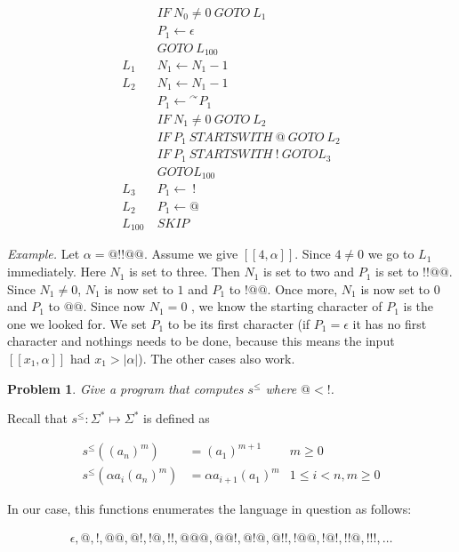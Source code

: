 \documentclass[a4paper, 12pt]{article}
\newtheorem{problem}{Problem}
\newtheorem{problem}{Problem}
\begin{document}
\begin{align*}
    &IF ~ N_0 \neq 0 ~ GOTO ~ L_1 \\ 
    &P_1 \leftarrow \epsilon \\ 
    & GOTO ~ L_{100} \\
    L_1 ~ & N_1 \leftarrow N_1 - 1 \\ 
    L_2 ~ & N_1 \leftarrow N_1 - 1 \\ 
          &P_1 \leftarrow {}^{\curvearrowright} P_1\\
    &IF ~ N_1 \neq 0 ~ GOTO ~ L_2\\
    &IF ~ P_1 ~ STARTSWITH ~ @ ~ GOTO ~ L_2 \\ 
    &IF ~ P_1 ~ STARTSWITH ~ ! ~ GOTO L_3\\ 
    & GOTO L_{100}\\
    L_3~&P_1 \leftarrow ~ !\\
    L_2 ~ &P_1 \leftarrow  @ \\ 
    L_{100} ~ & SKIP
\end{align*}

\textit{Example.} Let $\alpha = @!!@@$. Assume we give $[\![ 4, \alpha ]\!]$.
Since $4 \neq 0$ we go to $L_1$ immediately. Here $N_1$ is set to three. Then
$N_1$ is set to two and $P_1$ is set to $!!@@$. Since $N_1 \neq 0$, $N_1$ is now
set to $1$ and $P_1$ to $!@@$. Once more, $N_1$ is now set to $0$ and $P_1$ to
$@@$. Since now $N_1 = 0$ , we know the starting character of $P_1$ is the one
we looked for. We set $P_1$ to be its first character (if $P_1 = \epsilon$ it
has no first character and nothings needs to be done, because this means the
input $[\![ x_1, \alpha ]\!]$ had $x_1 > |\alpha|$). The other cases also work.

\begin{problem}
    Give a program that computes $s^{\leq}$ where $@ < !$.
\end{problem}

Recall that $s^{\leq} : \Sigma^{*} \mapsto \Sigma^{*}$ is defined as 

\begin{align*}
    s^{\leq} \left( (a_n)^m \right)  &= (a_1)^{m + 1} & m \geq 0\\ 
    s^{\leq} \left( \alpha a_i (a_n)^{m} \right) &= \alpha a_{i+1} (a_1)^{m} & 1
    \leq i < n, m \geq 0
\end{align*}

In our case, this functions enumerates the language in question as follows: 

\begin{align*}
    \epsilon, @, !, @ @, @ !, !@, !!, @@@, @@!, @!@, @!!, !@@, !@!, !!@, !!!, \ldots
\end{align*}
\end{document}
